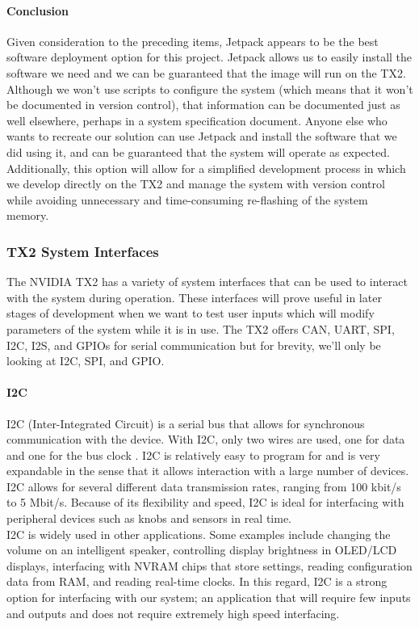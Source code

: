 \paragraph{Conclusion}
Given consideration to the preceding items, Jetpack appears to be the best software deployment option for this project. Jetpack allows us to easily install the software we need and we can be guaranteed that the image will run on the TX2. Although we won't use scripts to configure the system (which means that it won't be documented in version control), that information can be documented just as well elsewhere, perhaps in a system specification document. Anyone else who wants to recreate our solution can use Jetpack and install the software that we did using it, and can be guaranteed that the system will operate as expected. Additionally, this option will allow for a simplified development process in which we develop directly on the TX2 and manage the system with version control while avoiding unnecessary and time-consuming re-flashing of the system memory.

\newpage
\subsubsection{TX2 System Interfaces}
The NVIDIA TX2 has a variety of system interfaces that can be used to interact with the system during operation. These interfaces will prove useful in later stages of development when we want to test user inputs which will modify parameters of the system while it is in use. The TX2 offers CAN, UART, SPI, I2C, I2S, and GPIOs for serial communication but for brevity, we'll only be looking at I2C, SPI, and GPIO.

\paragraph{I2C}
I2C (Inter-Integrated Circuit) is a serial bus that allows for synchronous communication with the device. With I2C, only two wires are used, one for data and one for the bus clock \cite{i2cBus}. I2C is relatively easy to program for and is very expandable in the sense that it allows interaction with a large number of devices. I2C allows for several different data transmission rates, ranging from 100 kbit/s to 5 Mbit/s. Because of its flexibility and speed, I2C is ideal for interfacing with peripheral devices such as knobs and sensors in real time. \\

I2C is widely used in other applications. Some examples include changing the volume on an intelligent speaker, controlling display brightness in OLED/LCD displays, interfacing with NVRAM chips that store settings, reading configuration data from RAM, and reading real-time clocks. In this regard, I2C is a strong option for interfacing with our system; an application that will require few inputs and outputs and does not require extremely high speed interfacing.

